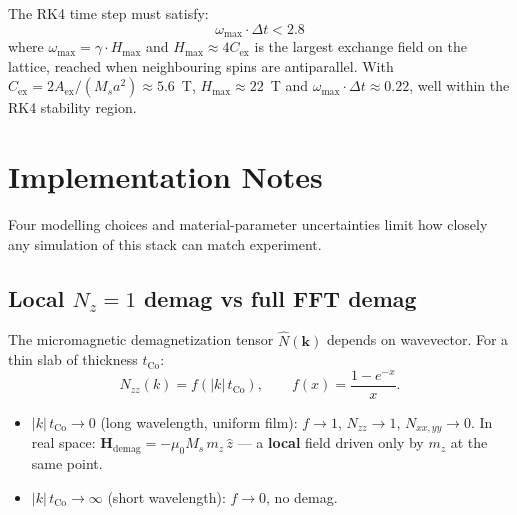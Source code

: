 \documentclass[11pt,a4paper]{article}
\newcommand{\mb}[1]{\mathbf{#1}}
\newcommand{\zhat}{\hat{z}}
\newcommand{\Hdemag}{\mb{H}_{\text{demag}}}
\newcommand{\tCo}{t_{\text{Co}}}
\newcommand{\Aex}{A_{\text{ex}}}
\newcommand{\Ms}{M_s}
\begin{document}
The RK4 time step must satisfy:
%
\begin{equation}
\omega_{\text{max}} \cdot \Delta t < 2.8
\end{equation}
%
where $\omega_{\text{max}} = \gamma \cdot H_{\text{max}}$ and
$H_{\text{max}} \approx 4 C_{\text{ex}}$ is the largest exchange
field on the lattice, reached when neighbouring spins are
antiparallel.  With $C_{\text{ex}} = 2\Aex/(\Ms a^2) \approx 5.6$~T,
$H_{\text{max}} \approx 22$~T and
$\omega_{\text{max}} \cdot \Delta t \approx 0.22$, well within the
RK4 stability region.

\section{Implementation Notes}
\label{sec:implementation_notes}

Four modelling choices and material-parameter uncertainties limit
how closely any simulation of this stack can match experiment.

\subsection{Local $N_z = 1$ demag vs full FFT demag}

The micromagnetic demagnetization tensor $\hat N(\mb{k})$ depends on
wavevector. For a thin slab of thickness $\tCo$:
%
\begin{equation}
N_{zz}(k) = f(|k|\,\tCo),
\qquad f(x) = \frac{1 - e^{-x}}{x}.
\end{equation}
%
\begin{itemize}[leftmargin=2em, nosep]
    \item $|k|\,\tCo \to 0$ (long wavelength, uniform film):
        $f \to 1$, $N_{zz} \to 1$, $N_{xx, yy} \to 0$. In real space:
        $\Hdemag = -\mu_0 \Ms\, m_z\,\zhat$ --- a \textbf{local}
        field driven only by $m_z$ at the same point.
    \item $|k|\,\tCo \to \infty$ (short wavelength): $f \to 0$, no
        demag.
\end{itemize}
\end{document}
